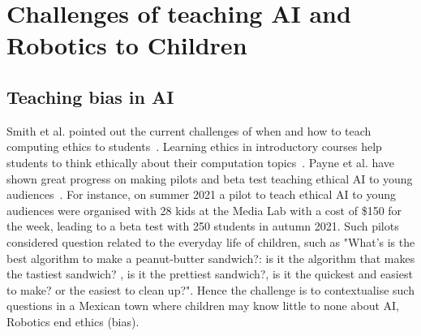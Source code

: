 \documentclass[sigconf,anonymous,review]{acmart}
\begin{document}
\section{Challenges of teaching AI and Robotics to Children}
\subsection{Teaching bias in AI}
Smith et al. pointed out the current challenges of when and how to teach computing ethics to students~\cite{smith2022incorporating}.
Learning ethics in introductory courses help students to think ethically about their computation topics~\cite{fiesler2021}.
Payne et al. have shown great progress on making pilots and beta test teaching ethical AI to young audiences~\cite{payne2020}.
For instance, on summer 2021 a pilot to teach ethical AI to young audiences were organised with 28 kids at the Media Lab with a cost of \$150 for the week, leading to a beta test with 250 students in autumn 2021. 
Such pilots considered question related to the everyday life of children, such as "What's is the best algorithm to make a peanut-butter sandwich?: is it the algorithm that makes the tastiest sandwich? , is it the prettiest sandwich?, is it the quickest and easiest to make? or the easiest to clean up?". 
Hence the challenge is to contextualise such questions in a Mexican town where children may know little to none about AI, Robotics end ethics (bias).

\end{document}
